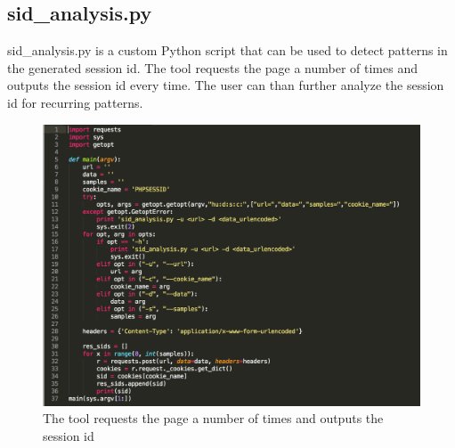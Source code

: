 \subsection{sid\_analysis.py}
sid\_analysis.py is a custom Python script that can be used to detect patterns in the generated session id.
The tool requests the page a number of times and outputs the session id every time. The user can than further analyze the session id for recurring patterns.
\begin{figure}[ht]
	\centering
	\includegraphics[width=.8\linewidth]{figures/tool_sid_analysis.png}
	\caption{The tool requests the page a number of times and outputs the session id}
	\label{fig:tool_sid_analysis}
\end{figure}